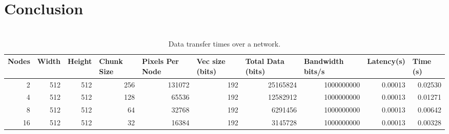 \documentclass[journal,transmag]{IEEEtran}
\begin{document}
	
\section{Conclusion}
	\lipsum[7-8]
	
		




\newpage
\onecolumn
\appendices

\section{}
\begin{table}[h]
	\centering
	\caption{Data transfer times over a network.}
	\label{table_network}
	\begin{tabular}{|r|r|r|r|r|r|r|r|r|r|}
		\hline
		\multicolumn{1}{|l|}{Nodes} & \multicolumn{1}{l|}{Width} & \multicolumn{1}{l|}{Height} & \multicolumn{1}{l|}{Chunk Size} & \multicolumn{1}{l|}{Pixels Per Node} & \multicolumn{1}{l|}{Vec size (bits)} & \multicolumn{1}{l|}{Total Data (bits)} & \multicolumn{1}{l|}{Bandwidth bits/s} & \multicolumn{1}{l|}{Latency(s)} & \multicolumn{1}{l|}{Time (s)} \\ \hline
		2                           & 512                        & 512                         & 256                             & 131072                               & 192                                  & 25165824                               & 1000000000                            & 0.00013                         & 0.02530                       \\ \hline
		4                           & 512                        & 512                         & 128                             & 65536                                & 192                                  & 12582912                               & 1000000000                            & 0.00013                         & 0.01271                       \\ \hline
		8                           & 512                        & 512                         & 64                              & 32768                                & 192                                  & 6291456                                & 1000000000                            & 0.00013                         & 0.00642                       \\ \hline
		16                          & 512                        & 512                         & 32                              & 16384                                & 192                                  & 3145728                                & 1000000000                            & 0.00013                         & 0.00328                       \\ \hline

\end{tabular}
\end{table}
\end{document}
